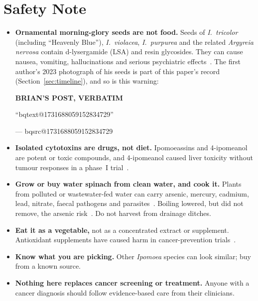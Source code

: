 \documentclass[11pt,a4paper]{article}
\makeatletter
\newcommand{\BQ}[1]{\begin{tcolorbox}[bqstyle]%
{\sffamily\bfseries\footnotesize\color{teal!80!black}BRIAN'S POST, VERBATIM}\par\smallskip
``\csname bqtext@#1\endcsname''\par\smallskip
{\raggedleft\footnotesize --- \csname bqsrc@#1\endcsname\par}\end{tcolorbox}}
\makeatother
\begin{document}
\section{Safety Note}
\label{sec:safety}

\begin{safetybox}
\begin{itemize}[leftmargin=*,itemsep=2pt]
\item \textbf{Ornamental morning-glory seeds are not food.} Seeds of \emph{I.~tricolor} (including ``Heavenly Blue''), \emph{I.~violacea}, \emph{I.~purpurea} and the related \emph{Argyreia nervosa} contain d-lysergamide (LSA) and resin glycosides. They can cause nausea, vomiting, hallucinations and serious psychiatric effects~\cite{juszczak2013}. The first author's 2023 photograph of his seeds is part of this paper's record (Section~\ref{sec:timeline}), and so is this warning:
\BQ{1731688059152834729}
\item \textbf{Isolated cytotoxins are drugs, not diet.} Ipomoeassins and 4-ipomeanol are potent or toxic compounds, and 4-ipomeanol caused liver toxicity without tumour responses in a phase~I trial~\cite{cao2007,kasturi1998}.
\item \textbf{Grow or buy water spinach from clean water, and cook it.} Plants from polluted or wastewater-fed water can carry arsenic, mercury, cadmium, lead, nitrate, faecal pathogens and parasites~\cite{wu2026,gothberg2002,thang2021,vuong2007,graczyk2001}. Boiling lowered, but did not remove, the arsenic risk~\cite{wu2026}. Do not harvest from drainage ditches.
\item \textbf{Eat it as a vegetable,} not as a concentrated extract or supplement. Antioxidant supplements have caused harm in cancer-prevention trials~\cite{alphatocopherolbetac1994,omenn1996,klein2011}.
\item \textbf{Know what you are picking.} Other \emph{Ipomoea} species can look similar; buy from a known source.
\item \textbf{Nothing here replaces cancer screening or treatment.} Anyone with a cancer diagnosis should follow evidence-based care from their clinicians.
\end{itemize}
\end{safetybox}

\end{document}

